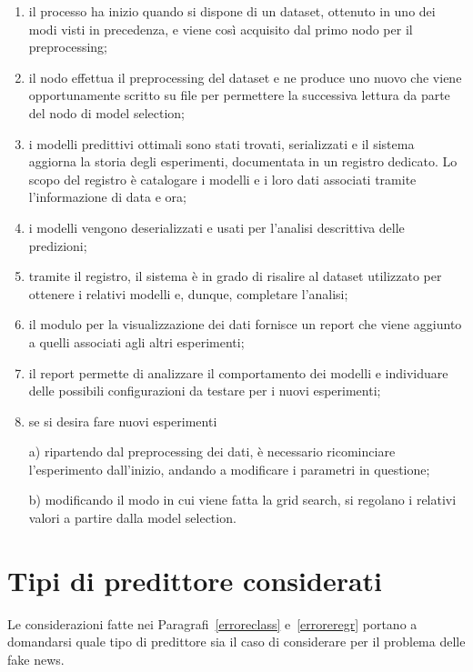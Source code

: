 \documentclass[12pt]{report}
\theoremstyle{definition}
\begin{document}
\begin{enumerate}
    \item il processo ha inizio quando si dispone di un dataset, ottenuto in uno dei modi visti in precedenza, e viene così acquisito dal primo nodo per il preprocessing;
    \item  il nodo effettua il preprocessing del dataset e ne produce uno nuovo che viene opportunamente scritto su file per permettere la successiva lettura da parte del nodo di model selection;
    \item i modelli predittivi ottimali sono stati trovati, serializzati e il sistema aggiorna la storia degli esperimenti, documentata in un registro dedicato. Lo scopo del registro è catalogare i modelli e i loro dati associati tramite l'informazione di data e ora;
    \item i modelli vengono deserializzati e usati per l'analisi descrittiva delle predizioni;
    \item tramite il registro, il sistema è in grado di risalire al dataset utilizzato per ottenere i relativi modelli e, dunque, completare l'analisi;
    \item il modulo per la visualizzazione dei dati fornisce un report che viene aggiunto a quelli associati agli altri esperimenti;
    \item il report permette di analizzare il comportamento dei modelli e individuare delle possibili configurazioni da testare per i nuovi esperimenti;
    \item se si desira fare nuovi esperimenti
    
    a) ripartendo dal preprocessing dei dati, è necessario ricominciare l'esperimento dall'inizio, andando a modificare i parametri in questione;
    
    b) modificando il modo in cui viene fatta la grid search, si regolano i relativi valori a partire dalla model selection.
\end{enumerate}

\section{Tipi di predittore considerati}\label{predictors}
Le considerazioni fatte nei Paragrafi~\ref{erroreclass} e~\ref{erroreregr} portano a domandarsi quale tipo di predittore sia il caso di considerare per il problema delle fake news.
\end{document}
